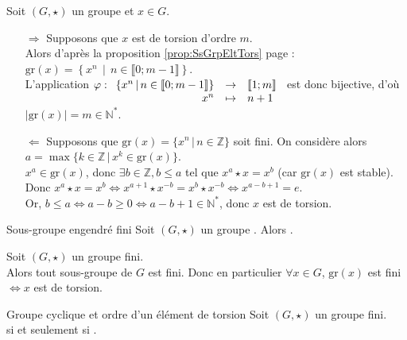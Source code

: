 \documentclass[12pt,a4paper]{report}
\begin{document}
    \begin{demo}
    Soit $(G, \star)$ un groupe et $x \in G$.
    \begin{itemize}
        \item[$\Rightarrow$] Supposons que $x$ est de torsion d'ordre $m$.\\
        Alors d'après la proposition \ref{prop:SsGrpEltTors} page \pageref{prop:SsGrpEltTors} : $\text{gr}(x) = \left\{ x^n \,\middle|\, n \in \llbracket 0 ; m - 1 \rrbracket \right\}$.\\
        L'application $\varphi : \begin{array}[t]{rcl} \left\{ x^n \,\middle|\, n \in \llbracket 0 ; m - 1 \rrbracket \right\} & \rightarrow & \llbracket 1 ; m \rrbracket \\ x^n & \mapsto & n + 1 \end{array}$ est donc bijective, d'où $| \text{gr}(x) | = m \in \mathbb{N}^*$.
        \item[$\Leftarrow$] Supposons que $\text{gr}(x) = \{ x^n \,|\, n \in \mathbb{Z}\}$ soit fini. On considère alors $a = \max\{k \in \mathbb{Z} \,|\, x^k \in \text{gr}(x)\}$.\\
        $x^a \in \text{gr}(x)$, donc $\exists b \in \mathbb{Z}, b \leqslant a$ tel que $x^a \star x = x^b$ (car $\text{gr}(x)$ est stable).\\
        Donc $x^a \star x = x^b \Leftrightarrow x^{a + 1}  \star x^{-b} = x^b \star x^{-b} \Leftrightarrow x^{a - b + 1} = e$.\\
        Or, $b \leqslant a \Leftrightarrow a - b \geqslant 0 \Leftrightarrow a - b + 1 \in \mathbb{N}^*$, donc $x$ est de torsion.
    \end{itemize}
    \end{demo}
    
    \begin{corollaire}{Sous-groupe engendré fini}{}
    Soit $(G, \star)$ un groupe . Alors .
    \end{corollaire}
    
    \begin{demo}
    Soit $(G, \star)$ un groupe fini.\\
    Alors tout sous-groupe de $G$ est fini. Donc en particulier $\forall x \in G$, $\text{gr}(x)$ est fini $\Leftrightarrow x$ est de torsion.
    \end{demo}
    
    \begin{proposition}{Groupe cyclique et ordre d'un élément de torsion}{}
    Soit $(G, \star)$ un groupe fini.\\
     si et seulement si .
    \end{proposition}
    
\end{document}
